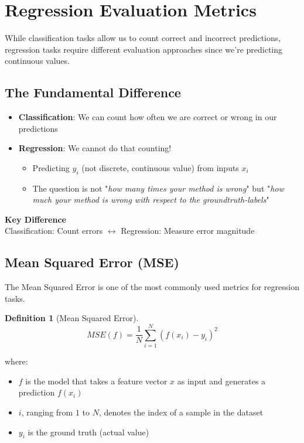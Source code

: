 \documentclass[11pt,a4paper]{article}
\theoremstyle{definition}
\newtheorem{definition}{Definition}[section]
\theoremstyle{plain}
\theoremstyle{remark}
\begin{document}
\section{Regression Evaluation Metrics}

While classification tasks allow us to count correct and incorrect predictions, regression tasks require different evaluation approaches since we're predicting continuous values.

\subsection{The Fundamental Difference}

\begin{itemize}
    \item \textbf{Classification}: We can count how often we are correct or wrong in our predictions
    \item \textbf{Regression}: We cannot do that counting!
    \begin{itemize}
        \item Predicting $y_i$ (not discrete, continuous value) from inputs $x_i$
        \item The question is not "\textit{how many times your method is wrong}" but "\textit{how much your method is wrong with respect to the groundtruth-labels}"
    \end{itemize}
\end{itemize}

\begin{center}
\colorbox{purple!15}{\parbox{0.9\textwidth}{
\centering
\textbf{Key Difference}\\[0.2cm]
Classification: Count errors $\leftrightarrow$ Regression: Measure error magnitude
}}
\end{center}

\subsection{Mean Squared Error (MSE)}

The Mean Squared Error is one of the most commonly used metrics for regression tasks.

\begin{definition}[Mean Squared Error]
\begin{equation}
MSE(f) = \frac{1}{N} \sum_{i=1}^{N} (f(x_i) - y_i)^2
\end{equation}

where:
\begin{itemize}
    \item $f$ is the model that takes a feature vector $x$ as input and generates a prediction $f(x_i)$
    \item $i$, ranging from $1$ to $N$, denotes the index of a sample in the dataset
    \item $y_i$ is the ground truth (actual value)
\end{itemize}
\end{definition}
\end{document}
